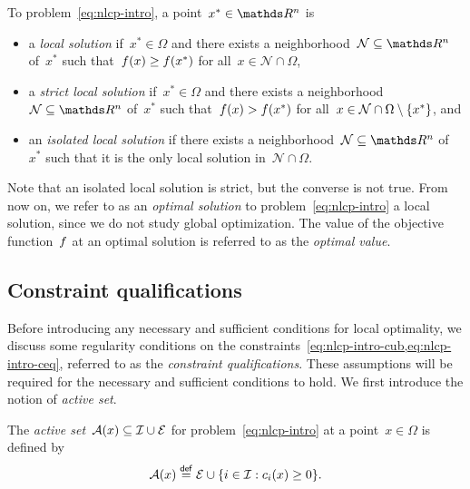 \begin{definition}
    \label{def:local-solution}
    To problem~\cref{eq:nlcp-intro}, a point~$x^{\ast} \in \R^n$ is
    \begin{itemize}
        \item a \emph{local solution} if~$x^{\ast} \in \Omega$ and there exists a neighborhood~$\mathcal{N} \subseteq \R^n$ of~$x^{\ast}$ such that~$f(x) \ge f(x^{\ast})$ for all~$x \in \mathcal{N} \cap \Omega$,
        \item a \emph{strict local solution} if~$x^{\ast} \in \Omega$ and there exists a neighborhood~$\mathcal{N} \subseteq \R^n$ of~$x^{\ast}$ such that~$f(x) > f(x^{\ast})$ for all~$x \in \mathcal{N} \cap \Omega \setminus \{x^{\ast}\}$, and
        \item an \emph{isolated local solution} if there exists a neighborhood~$\mathcal{N} \subseteq \R^n$ of~$x^{\ast}$ such that it is the only local solution in~$\mathcal{N} \cap \Omega$.
    \end{itemize}
\end{definition}

Note that an isolated local solution is strict, but the converse is not true.
From now on, we refer to as an \emph{optimal solution} to problem~\cref{eq:nlcp-intro} a local solution, since we do not study global optimization.
The value of the objective function~$f$ at an optimal solution is referred to as the \emph{optimal value}.

\subsection{Constraint qualifications}

Before introducing any necessary and sufficient conditions for local optimality, we discuss some regularity conditions on the constraints~\cref{eq:nlcp-intro-cub,eq:nlcp-intro-ceq}, referred to as the \emph{constraint qualifications}.
These assumptions will be required for the necessary and sufficient conditions to hold.
We first introduce the notion of \emph{active set}.

\begin{definition}
    The \emph{active set}~$\mathcal{A}(x) \subseteq \mathcal{I} \cup \mathcal{E}$ for problem~\cref{eq:nlcp-intro} at a point~$x \in \Omega$ is defined by
    \begin{equation*}
        \mathcal{A}(x) \mathrel{\stackrel{\mathsf{def}}{=}} \mathcal{E} \cup \{i \in \mathcal{I} : c_{i}(x) \ge 0\}.
    \end{equation*}
\end{definition}

